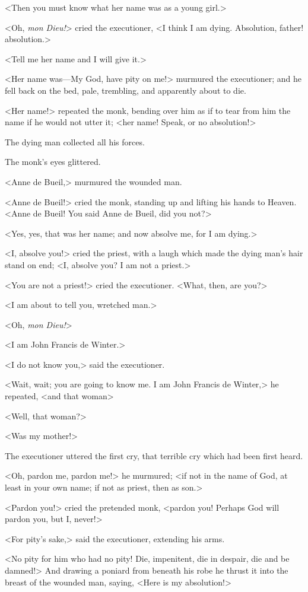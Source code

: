 <Then you must know what her name was as a young girl.>

<Oh, \textit{mon Dieu!}> cried the executioner, <I think I am dying. Absolution, father! absolution.>

<Tell me her name and I will give it.>

<Her name was—My God, have pity on me!> murmured the executioner; and he fell back on the bed, pale, trembling, and apparently about to die.

<Her name!> repeated the monk, bending over him as if to tear from him the name if he would not utter it; <her name! Speak, or no absolution!>

The dying man collected all his forces.

The monk's eyes glittered.

<Anne de Bueil,> murmured the wounded man.

<Anne de Bueil!> cried the monk, standing up and lifting his hands to Heaven. <Anne de Bueil! You said Anne de Bueil, did you not?>

<Yes, yes, that was her name; and now absolve me, for I am dying.>

<I, absolve you!> cried the priest, with a laugh which made the dying man's hair stand on end; <I, absolve you? I am not a priest.>

<You are not a priest!> cried the executioner. <What, then, are you?>

<I am about to tell you, wretched man.>

<Oh, \textit{mon Dieu!}>

<I am John Francis de Winter.>

<I do not know you,> said the executioner.

<Wait, wait; you are going to know me. I am John Francis de Winter,> he repeated, <and that woman\longdash>

<Well, that woman?>

<Was my mother!>

The executioner uttered the first cry, that terrible cry which had been first heard.

<Oh, pardon me, pardon me!> he murmured; <if not in the name of God, at least in your own name; if not as priest, then as son.>

<Pardon you!> cried the pretended monk, <pardon you! Perhaps God will pardon you, but I, never!>

<For pity's sake,> said the executioner, extending his arms.

<No pity for him who had no pity! Die, impenitent, die in despair, die and be damned!> And drawing a poniard from beneath his robe he thrust it into the breast of the wounded man, saying, <Here is my absolution!>

